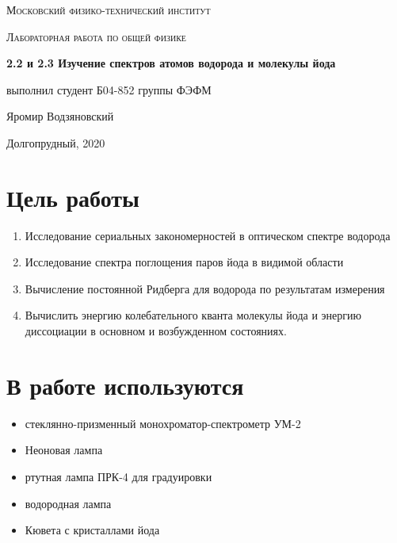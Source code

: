 \documentclass[a4paper]{article}
\begin{document}
\pagestyle{fancy} 
\fancyhead[C]{}
\fancyfoot[C]{ \noindent\rule{\textwidth}{0.4pt} \thepage }

\begin{titlepage}
	\centering
	\vspace{5cm}
    {\scshape\LARGE Московский физико-технический институт\par}
    

	\vspace{3cm}
	{\scshape\Large Лабораторная работа по общей физике \par}
	\vspace{1cm}
    {\huge\bfseries  2.2 и 2.3 Изучение спектров атомов водорода и молекулы йода \par}
	\vspace{1cm}
	\vfill
\begin{flushright}
	{\large выполнил студент Б04-852 группы ФЭФМ}\par
	\vspace{0.3cm}
	{\LARGE Яромир Водзяновский}
\end{flushright}

	
	\vfill
Долгопрудный, 2020
\end{titlepage}


\section{Цель работы}
\begin{enumerate}
    \item Исследование сериальных закономерностей в оптическом спектре водорода
    \item Исследование спектра поглощения паров йода в видимой области
    \item Вычисление постоянной Ридберга для водорода по результатам измерения
    \item Вычислить энергию колебательного кванта молекулы йода и энергию диссоциации в основном и возбужденном состояниях.
\end{enumerate}

\section{В работе используются}
\begin{itemize}
    \item стеклянно-призменный монохроматор-спектрометр УМ-2
    \item Неоновая лампа
    \item ртутная лампа ПРК-4 для градуировки 
    \item водородная лампа
    \item Кювета с кристаллами йода
\end{itemize}
\end{document}
